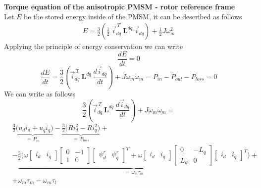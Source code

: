\documentclass[12pt,a4paper]{scrartcl}
\begin{document}
\begin{onehalfspace}
\textbf{Torque equation of the anisotropic PMSM - rotor reference frame}\\
Let $E$ be the stored energy inside of the PMSM, it can be described as follows
\begin{equation*}
	\begin{aligned}
		E = \frac{3}{2} \left(\frac{1}{2}\ \vec{i}_{dq}^{\ T}\ \mathbf{L}^{dq}\ \vec{i}_{dq}\right) +\frac{1}{2}J\omega_m^2
	\end{aligned} 
\end{equation*}
Applying the principle of energy conservation we can write
\begin{equation*}
	\frac{dE}{dt} = 0
\end{equation*}
\begin{equation*}
	\frac{dE}{dt} = \frac{3}{2} \left( \vec{i}_{dq}^{\ T}\ \mathbf{L}^{dq}\ \frac{d\vec{i}_{dq}}{dt}\right) + J\omega_m\dot{\omega}_m= P_{in}-P_{out}-P_{loss} = 0
\end{equation*}
We can write as follows
\begin{equation*}
	\frac{3}{2} \left( \vec{i}_{dq}^{\ T}\ \mathbf{L}^{dq}\ \frac{d\vec{i}_{dq}}{dt}\right) + J\omega_m\dot{\omega}_m =
\end{equation*}
\begin{equation*}
	\begin{aligned}
		&\underbrace{\frac{3}{2}\Big(u_d i_d+u_q i_q\Big)}_{=\,P_{in}}-\underbrace{\frac{3}{2}\Big(Ri_d^2-Ri_q^2\Big)}_{=\,P_{loss}} + \\[6pt]
		&-\underbrace{\frac{3}{2}\Big(\omega 
			\begin{bmatrix} i_d & i_q \end{bmatrix}
			\begin{bmatrix} 0 & -1 \\ 1 & 0\end{bmatrix}
			\begin{bmatrix} \psi^r_d & \psi^r_q \end{bmatrix}^T
			+\omega 
			\begin{bmatrix} i_d & i_q \end{bmatrix}
			\begin{bmatrix} 0 & -L_q \\ L_d & 0\end{bmatrix}
			\begin{bmatrix} i_d & i_q \end{bmatrix}^T\Big)
		}_{=\,\omega_m\tau_m} + \\[6pt]
		& +\omega_m\tau_m-\omega_m\tau_l
	\end{aligned}

\end{equation*}
\end{onehalfspace}
\end{document}
